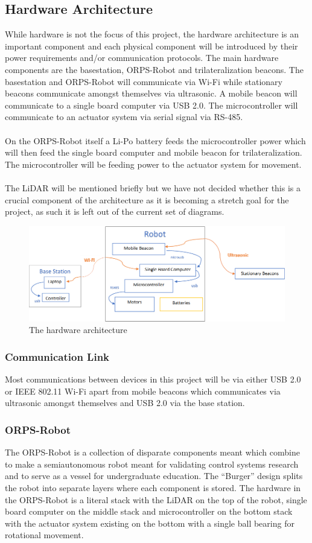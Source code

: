 \documentclass[english,12pt]{article}
\begin{document}
\subsection{Hardware Architecture}
While hardware is not the focus of this project, the
hardware architecture is an important component and
each physical component will be introduced by their
power requirements and/or communication protocols.
The main hardware components are the basestation,
ORPS-Robot and trilateralization beacons. The basestation
and ORPS-Robot will communicate via Wi-Fi while
 stationary beacons communicate amongst
themselves via ultrasonic. A mobile beacon
will communicate to a single board computer via USB 2.0. The
microcontroller will communicate to an 
actuator system via serial signal via RS-485.\\\\
On the ORPS-Robot itself a Li-Po battery feeds the
microcontroller power which will then feed the
single board computer and mobile beacon for trilateralization. The
microcontroller will be feeding power to the
actuator system for movement.\\\\
The LiDAR will be mentioned briefly but we
have not decided whether this is a crucial component
of the architecture as it is becoming a stretch goal for
the project, as such it is left out of the current set of
diagrams.
\begin{figure}
    \centerline{\includegraphics[scale = 1.9]{hard_arc.jpg}}
    \caption{The hardware architecture}
\end{figure}
\FloatBarrier
\subsubsection{Communication Link}
Most communications between devices in this project will be via either USB 2.0 or IEEE 802.11 Wi-Fi
apart from mobile beacons which communicates via ultrasonic amongst themselves and USB 2.0 via the
base station.
\subsubsection{ORPS-Robot}
The ORPS-Robot is a collection of disparate components meant which combine to make a semiautonomous
robot meant for validating control systems research and to serve as a vessel for
undergraduate education. The “Burger” design splits the robot into separate layers where each
component is stored. The hardware in the ORPS-Robot is a literal stack with the  LiDAR on the
top of the robot, single board computer on the middle stack and microcontroller on the bottom stack 
with the actuator system existing on the bottom with a single ball bearing for rotational
movement.
\end{document}
